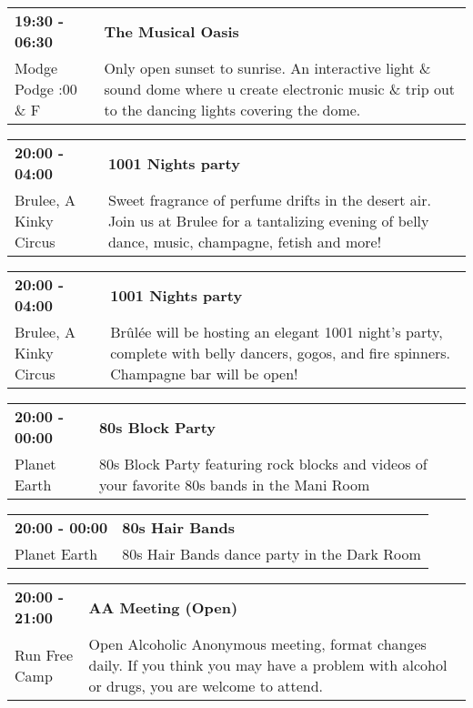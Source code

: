 \begin{tabular}{ p{1in} p{2.2in} }
    \textbf{19:30 - 06:30} & \textbf{The Musical Oasis} \\
    Modge Podge \newline 9:00 \& F & Only open sunset to sunrise.  An interactive light \& sound dome where u create electronic music \& trip out to the dancing lights covering the dome. \\
    \hline 
\end{tabular}
    
\begin{tabular}{ p{1in} p{2.2in} }
    \textbf{20:00 - 04:00} & \textbf{1001 Nights party} \\
    Brulee, A Kinky Circus \newline  & Sweet fragrance of perfume drifts in the desert air. Join us at Brulee for a tantalizing evening of belly dance, music, champagne, fetish and more! \\
    \hline 
\end{tabular}
    
\begin{tabular}{ p{1in} p{2.2in} }
    \textbf{20:00 - 04:00} & \textbf{1001 Nights party} \\
    Brulee, A Kinky Circus \newline  & Br\^ul\'ee will be hosting an elegant 1001 night's party, complete with belly dancers, gogos, and fire spinners. Champagne bar will be open! \\
    \hline 
\end{tabular}
    
\begin{tabular}{ p{1in} p{2.2in} }
    \textbf{20:00 - 00:00} & \textbf{80s Block Party} \\
    Planet Earth \newline  & 80s Block Party featuring rock blocks and videos of your favorite 80s bands in the Mani Room \\
    \hline 
\end{tabular}
    
\begin{tabular}{ p{1in} p{2.2in} }
    \textbf{20:00 - 00:00} & \textbf{80s Hair Bands} \\
    Planet Earth \newline  & 80s Hair Bands dance party in the Dark Room \\
    \hline 
\end{tabular}
    
\begin{tabular}{ p{1in} p{2.2in} }
    \textbf{20:00 - 21:00} & \textbf{AA Meeting (Open)} \\
    Run Free Camp \newline  & Open Alcoholic Anonymous meeting, format changes daily. If you think you may have a problem with alcohol or drugs, you are welcome to attend. \\
    \hline 
\end{tabular}
    
